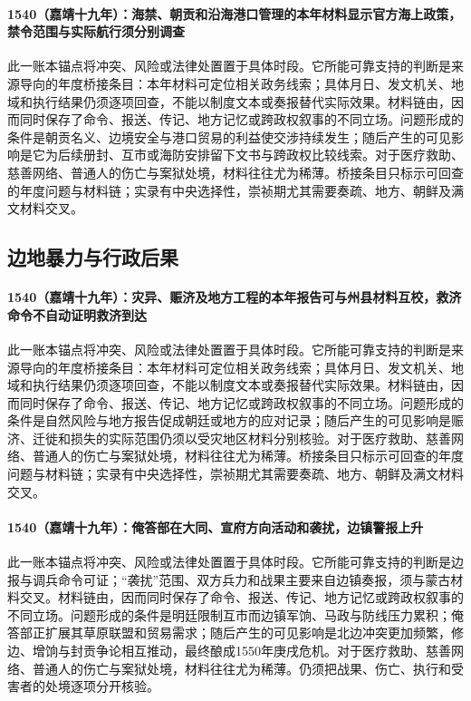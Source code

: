 \paragraph{1540（嘉靖十九年）：海禁、朝贡和沿海港口管理的本年材料显示官方海上政策，禁令范围与实际航行须分别调查} 此一账本锚点将冲突、风险或法律处置置于具体时段。它所能可靠支持的判断是来源导向的年度桥接条目：本年材料可定位相关政务线索；具体月日、发文机关、地域和执行结果仍须逐项回查，不能以制度文本或奏报替代实际效果。材料链由，因而同时保存了命令、报送、传记、地方记忆或跨政权叙事的不同立场。问题形成的条件是朝贡名义、边境安全与港口贸易的利益使交涉持续发生；随后产生的可见影响是它为后续册封、互市或海防安排留下文书与跨政权比较线索。对于医疗救助、慈善网络、普通人的伤亡与案狱处境，材料往往尤为稀薄。桥接条目只标示可回查的年度问题与材料链；实录有中央选择性，崇祯期尤其需要奏疏、地方、朝鲜及满文材料交叉。

\subsection{边地暴力与行政后果}

\paragraph{1540（嘉靖十九年）：灾异、赈济及地方工程的本年报告可与州县材料互校，救济命令不自动证明救济到达} 此一账本锚点将冲突、风险或法律处置置于具体时段。它所能可靠支持的判断是来源导向的年度桥接条目：本年材料可定位相关政务线索；具体月日、发文机关、地域和执行结果仍须逐项回查，不能以制度文本或奏报替代实际效果。材料链由，因而同时保存了命令、报送、传记、地方记忆或跨政权叙事的不同立场。问题形成的条件是自然风险与地方报告促成朝廷或地方的应对记录；随后产生的可见影响是赈济、迁徙和损失的实际范围仍须以受灾地区材料分别核验。对于医疗救助、慈善网络、普通人的伤亡与案狱处境，材料往往尤为稀薄。桥接条目只标示可回查的年度问题与材料链；实录有中央选择性，崇祯期尤其需要奏疏、地方、朝鲜及满文材料交叉。

\paragraph{1540（嘉靖十九年）：俺答部在大同、宣府方向活动和袭扰，边镇警报上升} 此一账本锚点将冲突、风险或法律处置置于具体时段。它所能可靠支持的判断是边报与调兵命令可证；“袭扰”范围、双方兵力和战果主要来自边镇奏报，须与蒙古材料交叉。材料链由，因而同时保存了命令、报送、传记、地方记忆或跨政权叙事的不同立场。问题形成的条件是明廷限制互市而边镇军饷、马政与防线压力累积；俺答部正扩展其草原联盟和贸易需求；随后产生的可见影响是北边冲突更加频繁，修边、增饷与封贡争论相互推动，最终酿成1550年庚戌危机。对于医疗救助、慈善网络、普通人的伤亡与案狱处境，材料往往尤为稀薄。仍须把战果、伤亡、执行和受害者的处境逐项分开核验。

